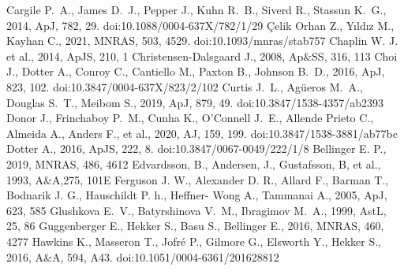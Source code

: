 \documentclass[a4paper,fleqn,usenatbib]{mnras}     %
\begin{document}
{\begin{thebibliography}{99}
 Cargile P.~A., James D.~J., Pepper J., Kuhn R.~B., Siverd R., Stassun K.~G., 2014, ApJ, 782, 29. doi:10.1088/0004-637X/782/1/29
 {\c{C}}elik Orhan Z., Y{\i}ld{\i}z M., Kayhan C., 2021, MNRAS, 503, 4529. doi:10.1093/mnras/stab757
 Chaplin W. J. et al., 2014, ApJS, 210, 1
 Christensen-Dalsgaard J., 2008, Ap\&SS, 316, 113
 Choi J., Dotter A., Conroy C., Cantiello M., Paxton B., Johnson B.~D., 2016, ApJ, 823, 102. doi:10.3847/0004-637X/823/2/102
 Curtis J.~L., Ag{\"u}eros M.~A., Douglas S.~T., Meibom S., 2019, ApJ, 879, 49. doi:10.3847/1538-4357/ab2393
 Donor J., Frinchaboy P.~M., Cunha K., O'Connell J.~E., Allende Prieto C., Almeida A., Anders F., et al., 2020, AJ, 159, 199. doi:10.3847/1538-3881/ab77bc
 Dotter A., 2016, ApJS, 222, 8. doi:10.3847/0067-0049/222/1/8
 Bellinger E. P., 2019, MNRAS, 486, 4612
 Edvardsson, B., Andersen, J., Gustafsson, B, et al., 1993, A\&A,275, 101E
 Ferguson J. W.,
Alexander D. R., Allard F., Barman T., Bodnarik J. G., Hauschildt P. h., Heffner- Wong A., Tammanai A., 2005, ApJ, 623, 585
 Glushkova E.~V., Batyrshinova V.~M., Ibragimov M.~A., 1999, AstL, 25, 86
 Guggenberger E., Hekker S., Basu S., Bellinger E., 2016, MNRAS, 460,
4277
 Hawkins K., Masseron T., Jofr{\'e} P., Gilmore G., Elsworth Y., Hekker S., 2016, A\&A, 594, A43. doi:10.1051/0004-6361/201628812

\end{thebibliography}}
\end{document}
